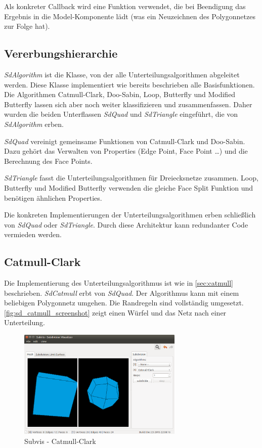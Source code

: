 Als konkreter Callback wird eine Funktion verwendet, die bei Beendigung das Ergebnis in die Model-Komponente lädt (was ein Neuzeichnen des Polygonnetzes zur Folge hat).

\subsection{Vererbungshierarchie}

\emph{SdAlgorithm} ist die Klasse, von der alle Unterteilungsalgorithmen abgeleitet werden.
Diese Klasse implementiert wie bereits beschrieben alle Basisfunktionen.
Die Algorithmen Catmull-Clark, Doo-Sabin, Loop, Butterfly und Modified Butterfly lassen sich aber
noch weiter klassifizieren und zusammenfassen.
Daher wurden die beiden Unterflassen \emph{SdQuad} und \emph{SdTriangle} eingeführt,
die von \emph{SdAlgorithm} erben.

\emph{SdQuad} vereinigt gemeinsame Funktionen von Catmull-Clark und Doo-Sabin.
Dazu gehört das Verwalten von Properties (Edge Point, Face Point \ldots) und
die Berechnung des Face Points.

\emph{SdTriangle} fasst die Unterteilungsalgorithmen für Dreiecksnetze zusammen.
Loop, Butterfly und Modified Butterfly verwenden die gleiche Face Split Funktion
und benötigen ähnlichen Properties.

Die konkreten Implementierungen der Unterteilungsalgorithmen erben schließlich
von \emph{SdQuad} oder \emph{SdTriangle}.
Durch diese Architektur kann redundanter Code vermieden werden.


\subsection{Catmull-Clark}

Die Implementierung des Unterteilungsalgorithmus ist wie in \autoref{sec:catmull}
beschrieben. \emph{SdCatmull} erbt von \emph{SdQuad}.
Der Algorithmus kann mit einem beliebigen Polygonnetz umgehen.
Die Randregeln sind vollständig umgesetzt.
\autoref{fig:sd_catmull_screenshot} zeigt einen Würfel und das Netz nach
einer Unterteilung.

\begin{figure}
  \centering
  \includegraphics[width=0.7\textwidth]{content/media/sd_catmull_screenshot.png}
  \caption{Subvis - Catmull-Clark}
  \label{fig:sd_catmull_screenshot}
\end{figure}


